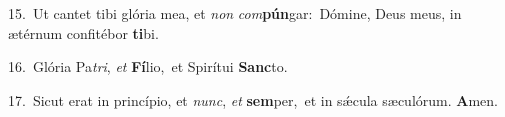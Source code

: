 {\numbfont\textcolor{\numbcolor}{15.}}~Ut cantet tibi glória mea, et \textit{non} \textit{com}\-\textbf{pún}gar:~\star Dómine, Deus meus, in ætérnum confitébor \textbf{ti}\-bi.\par
{\numbfont\textcolor{\numbcolor}{16.}}~Glória Pa\-\textit{tri}\-, \textit{et} \textbf{Fí}\-lio,~\star et Spirítui \textbf{Sanc}\-to.\par
{\numbfont\textcolor{\numbcolor}{17.}}~Sicut erat in princípio, et \textit{nunc}\-, \textit{et} \textbf{sem}\-per,~\star et in sǽcula sæculórum. \textbf{A}\-men.\par
